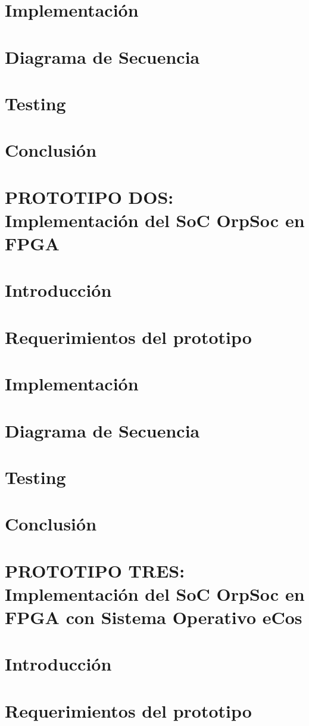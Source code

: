 		\section{Implementación}
		\section{Diagrama de Secuencia}
		\section{Testing}
		\section{Conclusión}
	\section{PROTOTIPO DOS: Implementación del SoC OrpSoc en FPGA}
		\section{Introducción}
		\section{Requerimientos del prototipo}
		\section{Implementación}
		\section{Diagrama de Secuencia}
		\section{Testing}
		\section{Conclusión}
	\section{PROTOTIPO TRES: Implementación del SoC OrpSoc en FPGA con Sistema Operativo eCos}
		\section{Introducción}
		\section{Requerimientos del prototipo}
